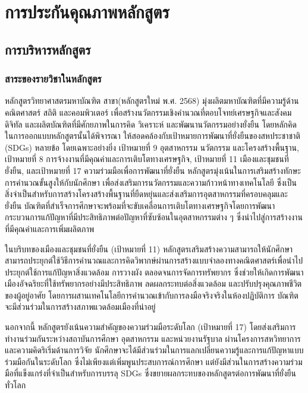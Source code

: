 \chapter{การประกันคุณภาพหลักสูตร}
\section{การบริหารหลักสูตร}
\subsection{สาระของรายวิชาในหลักสูตร}
หลักสูตรวิทยาศาสตรมหาบัณฑิต สาขา\thdegreebranch (หลักสูตรใหม่ พ.ศ. 2568) มุ่งผลิตมหาบัณฑิตที่มีความรู้ด้านคณิตศาสตร์ สถิติ และคอมพิวเตอร์ เพื่อสร้างนวัตกรรมเชิงคำนวณที่ตอบโจทย์เศรษฐกิจและสังคมดิจิทัล และผลิตบัณฑิตที่มีศักยภาพในการคิด วิเคราะห์ และพัฒนานวัตกรรมอย่างยั่งยืน โดยหลักคิดในการออกแบบหลักสูตรนั้นได้พิจารณา
ให้สอดคล้องกับเป้าหมายการพัฒนาที่ยั่งยืนของสหประชาชาติ (SDGs) หลายข้อ โดยเฉพาะอย่างยิ่ง เป้าหมายที่ 9 อุตสาหกรรม นวัตกรรม และโครงสร้างพื้นฐาน, เป้าหมายที่ 8 การจ้างงานที่มีคุณค่าและการเติบโตทางเศรษฐกิจ, เป้าหมายที่ 11 เมืองและชุมชนที่ยั่งยืน, และเป้าหมายที่ 17 ความร่วมมือเพื่อการพัฒนาที่ยั่งยืน หลักสูตรมุ่งเน้นในการเสริมสร้างทักษะการคำนวณขั้นสูงให้กับนักศึกษา เพื่อส่งเสริมการนวัตกรรมและความก้าวหน้าทางเทคโนโลยี ซึ่งเป็นสิ่งจำเป็นสำหรับการสร้างโครงสร้างพื้นฐานที่ยืดหยุ่นและส่งเสริมการอุตสาหกรรมที่ครอบคลุมและยั่งยืน บัณฑิตที่สำเร็จการศึกษาจะพร้อมที่จะขับเคลื่อนการเติบโตทางเศรษฐกิจโดยการพัฒนากระบวนการแก้ปัญหาที่มีประสิทธิภาพต่อปัญหาที่ซับซ้อนในอุตสาหกรรมต่าง ๆ ซึ่งนำไปสู่การสร้างงานที่มีคุณค่าและการเพิ่มผลิตภาพ

ในบริบทของเมืองและชุมชนที่ยั่งยืน (เป้าหมายที่ 11) หลักสูตรเสริมสร้างความสามารถให้นักศึกษาสามารถประยุกต์ใช้วิธีการคำนวณและการคิดวิพากษ์ผ่านการสร้างแบบจำลองทางคณิตศาสตร์เพื่อนำไปประยุกต์ใช้การแก้ปัญหาสิ่งแวดล้อม การวางผัง ตลอดจนการจัดการทรัพยากร ซึ่งช่วยให้เกิดการพัฒนาเมืองอัจฉริยะที่ใช้ทรัพยากรอย่างมีประสิทธิภาพ ลดผลกระทบต่อสิ่งแวดล้อม และปรับปรุงคุณภาพชีวิตของผู้อยู่อาศัย โดยการผสานเทคโนโลยีการคำนวณเข้ากับการลงมือจริงจริงในห้องปฏิบัติการ บัณฑิตจะมีส่วนร่วมในการสร้างสภาพแวดล้อมเมืองที่น่าอยู่

นอกจากนี้ หลักสูตรยังเน้นความสำคัญของความร่วมมือระดับโลก (เป้าหมายที่ 17) โดยส่งเสริมการทำงานร่วมกันระหว่างสถาบันการศึกษา อุตสาหกรรม และหน่วยงานรัฐบาล ผ่านโครงการสหวิทยาการและความคิดริเริ่มด้านการวิจัย นักศึกษาจะได้มีส่วนร่วมในการแลกเปลี่ยนความรู้และการแก้ปัญหาแบบร่วมมือกันในระดับโลก ซึ่งไม่เพียงแต่เพิ่มพูนประสบการณ์การศึกษา แต่ยังมีส่วนในการสร้างความร่วมมือที่แข็งแกร่งที่จำเป็นสำหรับการบรรลุ SDGs ซึ่งขยายผลกระทบของหลักสูตรต่อการพัฒนาที่ยั่งยืนทั่วโลก

